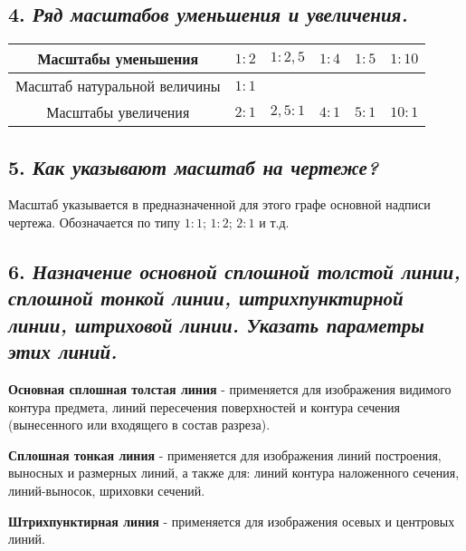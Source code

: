 \subsection*{4. \textit{Ряд масштабов уменьшения и увеличения.}}
\begin{center}
\begin{tabular}{|c|c|c|c|c|c|}
\hline




Масштабы уменьшения&$1:2$&$1:2,5$&$1:4$&$1:5$&$1:10$\\ \hline

Масштаб натуральной величины&$1:1$&&&&\\ \hline

Масштабы увеличения&$2:1$&$2,5:1$&$4:1$&$5:1$&$10:1$\\ \hline

\hline
\end{tabular}
\end{center}
\subsection*{5. \textit{Как указывают масштаб на чертеже?}}

Масштаб указывается в предназначенной для этого графе основной надписи чертежа. Обозначается по типу $1:1$; $1:2$; $2:1$ и т.д.
\subsection*{6. \textit{Назначение основной сплошной толстой линии, сплошной тонкой линии, штрихпунктирной линии, штриховой линии. Указать параметры этих линий.}}

\textbf{Основная сплошная толстая линия} - применяется для изображения видимого контура предмета, линий пересечения поверхностей и контура сечения (вынесенного или входящего в состав разреза).

\textbf{Сплошная тонкая линия} - применяется для изображения линий построения, выносных и размерных линий, а также для: линий контура наложенного сечения, линий-выносок, шриховки сечений.

\textbf{Штрихпунктирная линия} - применяется для изображения осевых и центровых линий.

